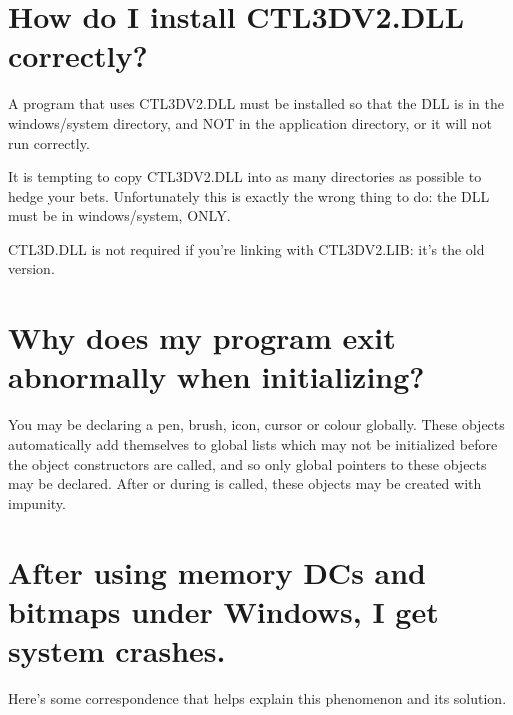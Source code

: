 \section{How do I install CTL3DV2.DLL correctly?}

A program that uses CTL3DV2.DLL must be installed so that
the DLL is in the windows/system directory, and NOT in
the application directory, or it will not run correctly.

It is tempting to copy CTL3DV2.DLL into as many directories
as possible to hedge your bets. Unfortunately this is exactly
the wrong thing to do: the DLL must be in windows/system, ONLY.

CTL3D.DLL is not required if you're linking with CTL3DV2.LIB:
it's the old version.

\section{Why does my program exit abnormally when initializing?}

You may be declaring a pen, brush, icon, cursor or colour globally.
These objects automatically add themselves to global lists which may
not be initialized before the object constructors are called, and so
only global pointers to these objects may be declared. After or during
 is called, these objects may be created with impunity.

\section{After using memory DCs and bitmaps under Windows, I get system crashes.}

Here's some correspondence that helps explain this phenomenon and its
solution.


